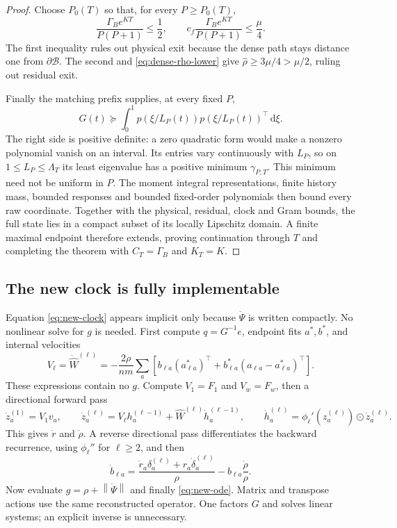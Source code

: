 \documentclass[11pt]{article}
\theoremstyle{definition}
\theoremstyle{remark}
\newcommand{\norm}[1]{\left\lVert #1\right\rVert}
\newcommand{\od}{\mathbin{\odot}}
\newcommand{\dd}{\,\mathrm{d}}
\begin{document}
\begin{proof}
Choose $P_0(T)$ so that, for every $P\ge P_0(T)$,
\begin{equation}
 \frac{\Gamma_Be^{KT}}{P(P+1)}\le\frac12,\qquad
 c_f\frac{\Gamma_Be^{KT}}{P(P+1)}\le\frac\mu4.      \label{eq:new-order-condition}
\end{equation}
The first inequality rules out physical exit because the dense path stays
distance one from $\partial\mathcal B$.  The second and
\eqref{eq:dense-rho-lower} give
$\widehat\rho\ge3\mu/4>\mu/2$, ruling out residual exit.

Finally the matching prefix supplies, at every fixed $P$,
\begin{equation}
 G(t)\succeq\int_0^1p(\xi/L_P(t))p(\xi/L_P(t))^\top\dd\xi. \label{eq:prefix-gram}
\end{equation}
The right side is positive definite: a zero quadratic form would make a
nonzero polynomial vanish on an interval.  Its entries vary continuously
with $L_P$, so on $1\le L_P\le\Lambda_T$ its least eigenvalue has a positive
minimum $\gamma_{P,T}$.  This minimum need not be uniform in $P$.
The moment integral representations, finite history mass, bounded responses
and bounded fixed-order polynomials then bound every raw coordinate.
Together with the physical, residual, clock and Gram bounds, the full state
lies in a compact subset of its locally Lipschitz domain.  A finite maximal
endpoint therefore extends, proving continuation through $T$ and completing
the theorem with $C_T=\Gamma_B$ and $K_T=K$.
\end{proof}

\subsection{The new clock is fully implementable}

Equation \eqref{eq:new-clock} appears implicit only because $\dot\Psi$ is
written compactly.  No nonlinear solve for $g$ is needed.  First compute
$q=G^{-1}e$, endpoint fits $a^*,b^*$, and internal velocities
\begin{equation}
 V_\ell=\dot{\widehat W}^{(\ell)}=-\frac{2\rho}{nm}\sum_a
 \left[b_{\ell a}(a^*_{\ell a})^\top+
 b^*_{\ell a}(a_{\ell a}-a^*_{\ell a})^\top\right]. \label{eq:internal-velocity}
\end{equation}
These expressions contain no $g$.  Compute $V_1=F_1$ and $V_w=F_w$, then a
directional forward pass
\[
 \dot z_a^{(1)}=V_1v_a,\qquad
 \dot z_a^{(\ell)}=V_\ell h_a^{(\ell-1)}+
 \widehat W^{(\ell)}\dot h_a^{(\ell-1)},\qquad
 \dot h_a^{(\ell)}=\phi_\ell'(z_a^{(\ell)})\od\dot z_a^{(\ell)}.
\]
This gives $\dot r$ and $\dot\rho$.  A reverse directional pass differentiates
the backward recurrence, using $\phi_\ell''$ for $\ell\ge2$, and then
\[
 \dot b_{\ell a}=\frac{\dot r_a\delta_a^{(\ell)}+
 r_a\dot\delta_a^{(\ell)}}{\rho}-b_{\ell a}\frac{\dot\rho}{\rho}.
\]
Now evaluate $g=\rho+\norm{\dot\Psi}$ and finally
\eqref{eq:new-ode}.  Matrix and transpose actions use the same reconstructed
operator.  One factors $G$ and solves linear systems; an explicit inverse is
unnecessary.
\end{document}
